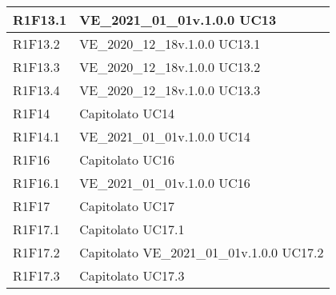 \begin{center}
\begin{longtable}{|p{22mm}|p{44mm}|}
R1F13.1 &
VE\_2021\_01\_01v.1.0.0 \newline
UC13 \newline
\\
\hline

R1F13.2 &
VE\_2020\_12\_18v.1.0.0 \newline
UC13.1 \newline
\\
\hline

R1F13.3 &
VE\_2020\_12\_18v.1.0.0 \newline
UC13.2 \newline
\\
\hline

R1F13.4 &
VE\_2020\_12\_18v.1.0.0 \newline
UC13.3 \newline
\\
\hline

R1F14 &
Capitolato \newline
UC14 \newline
\\
\hline

R1F14.1 &
VE\_2021\_01\_01v.1.0.0 \newline
UC14 \newline
\\
\hline

R1F16 &
Capitolato \newline
UC16 \newline
\\
\hline

R1F16.1 &
VE\_2021\_01\_01v.1.0.0 \newline
UC16 \newline
\\
\hline

R1F17 &
Capitolato \newline
UC17 \newline
\\
\hline

R1F17.1 &
Capitolato \newline
UC17.1 \newline
\\
\hline

R1F17.2 &
Capitolato \newline
VE\_2021\_01\_01v.1.0.0 \newline
UC17.2 \newline
\\
\hline

R1F17.3 &
Capitolato \newline
UC17.3 \newline
\\
\hline


\end{longtable}
\end{center}
